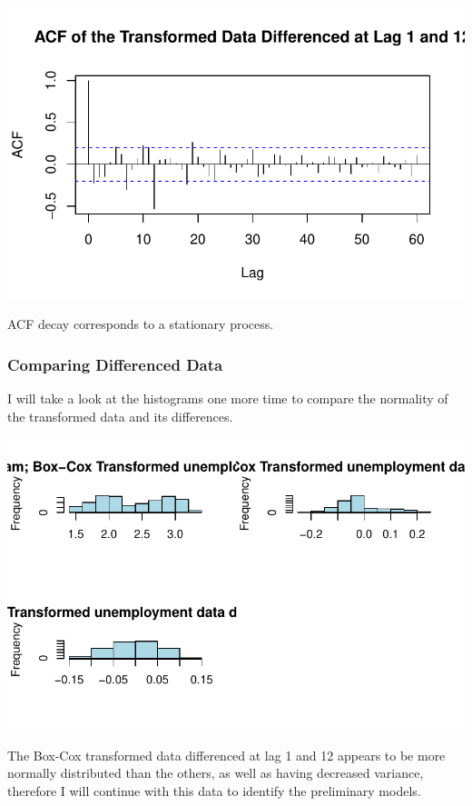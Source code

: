 \documentclass[
  letterpaper,
  DIV=11,
  numbers=noendperiod]{scrartcl}
\begin{document}
\includegraphics{Final_Project_files/figure-pdf/unnamed-chunk-14-1.pdf}

ACF decay corresponds to a stationary process.

\hypertarget{comparing-differenced-data}{%
\subsubsection{Comparing Differenced
Data}\label{comparing-differenced-data}}

I will take a look at the histograms one more time to compare the
normality of the transformed data and its differences.

\includegraphics{Final_Project_files/figure-pdf/unnamed-chunk-15-1.pdf}

The Box-Cox transformed data differenced at lag 1 and 12 appears to be
more normally distributed than the others, as well as having decreased
variance, therefore I will continue with this data to identify the
preliminary models.
\end{document}
